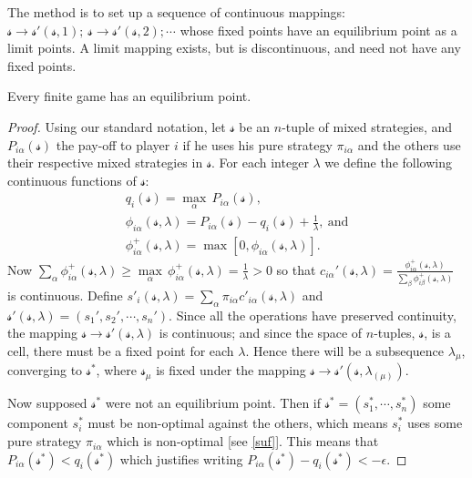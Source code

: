    The method is to set up a sequence of continuous mappings: $\mathcal{s} \to \mathcal{s} '(\mathcal{s} ,1);\ \mathcal{s} \to \mathcal{s} '(\mathcal{s} ,2); \cdots $ whose fixed points have an equilibrium point as a limit points. A limit mapping exists, but is discontinuous, and need not have any fixed points.
\begin{theorem}
    Every finite game has an equilibrium point.
\end{theorem}
\begin{proof}
    Using our standard notation, let $\mathcal{s} $ be an $n$-tuple of mixed strategies, and $P_{i\alpha }(\mathcal{s} )$ the pay-off to player $i$ if he uses his pure strategy $\pi_{i\alpha }$ and the others use their respective mixed strategies in $\mathcal{s} $. For each integer $\lambda$ we define the following continuous functions of $\mathcal{s} $: 
    \begin{gather*}
        q_i (\mathcal{s} )= \underset{\alpha }{\operatorname{max}} \, P_{i\alpha }(\mathcal{s} ), \\
        \phi_{i\alpha }(\mathcal{s} ,\lambda )= P_{i\alpha }(\mathcal{s}) -q_i (\mathcal{s} )+ \frac{1}{\lambda}, \ \text{and} \\
        \phi_{i\alpha }^+ (\mathcal{s} ,\lambda)=\operatorname{max}\left[ 0,\phi_{i\alpha }(\mathcal{s} ,\lambda) \right] .
    \end{gather*}
    Now $\sum_{\alpha }^{} \phi_{i\alpha }^+ (\mathcal{s} ,\lambda)\geq \underset{\alpha }{\max} \, \phi_{i\alpha }^+(\mathcal{s} ,\lambda)=\frac{1}{\lambda}>0$ so that $c_{i\alpha }'(\mathcal{s} ,\lambda)= \frac{\phi_{i\alpha }^+ (\mathcal{s} ,\lambda)}{\sum_{\beta }^{} \phi_{i\beta }^+(\mathcal{s} ,\lambda)}$ is continuous. Define $s'_i (\mathcal{s} ,\lambda)=\sum_{\alpha }^{} \pi_{i\alpha }c'_{i\alpha }(\mathcal{s} ,\lambda)$ and $\mathcal{s} '(\mathcal{s} ,\lambda)=(s_1',s_2',\cdots ,s_n ')$. Since all the operations have preserved continuity, the mapping $\mathcal{s} \to \mathcal{s} '(\mathcal{s} ,\lambda)$ is continuous; and since the space of $n$-tuples, $\mathcal{s} $, is a cell, there must be a fixed point for each $\lambda$. Hence there will be a subsequence  $\lambda_{\mu}$, converging to $\mathcal{s} ^*$, where $\mathcal{s} _{\mu}$ is fixed under the mapping $\mathcal{s} \to \mathcal{s} '(\mathcal{s} ,\lambda _{(\mu)})$. 

    Now supposed $\mathcal{s} ^*$ were not an equilibrium point. Then if $\mathcal{s} ^*=(s_1^*,\cdots ,s_n ^*)$ some component $s_i ^*$ must be non-optimal against the others, which means $s_i ^*$ uses some pure strategy $\pi_{i\alpha }$ which is non-optimal [see \eqref{suf}]. This means that $P_{i\alpha }(\mathcal{s} ^*)<q_i (\mathcal{s} ^*)$ which justifies writing $P_{i\alpha }(\mathcal{s} ^*)-q_i (\mathcal{s} ^*)<-\epsilon$.


\end{proof}
